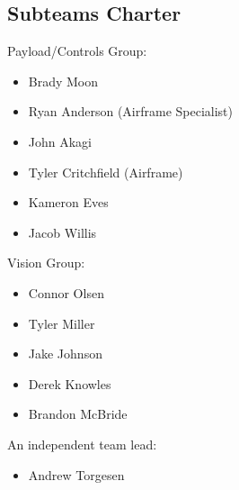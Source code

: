 \documentclass[]{../auvsi_doc}
\begin{document}
\newpage
\begin{appendices}

\section{Subteams Charter}
\label{appendix:subteamscharter}

Payload/Controls Group:
\begin{itemize}
\item Brady Moon
\item Ryan Anderson (Airframe Specialist)
\item John Akagi
\item Tyler Critchfield (Airframe)
\item Kameron Eves
\item Jacob Willis
\end{itemize}
Vision Group:
\begin{itemize}
\item Connor Olsen
\item Tyler Miller
\item Jake Johnson
\item Derek Knowles
\item Brandon McBride
\end{itemize}
An independent team lead:
\begin{itemize}
\item Andrew Torgesen
\end{itemize}

\end{appendices}
\end{document}
